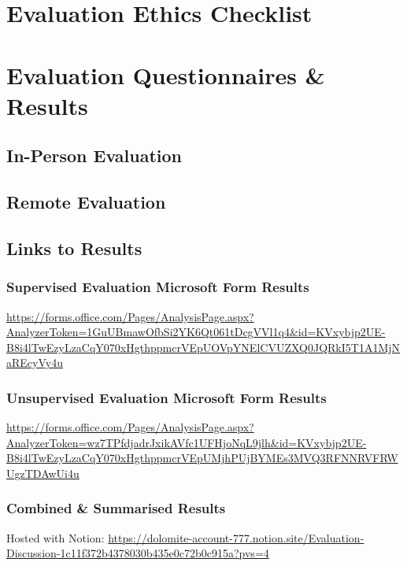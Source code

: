 \documentclass{l4proj}
\begin{document}
\begin{appendices}
\chapter{Evaluation Ethics Checklist}
\label{app:ethics-checklist}


\chapter{Evaluation Questionnaires \& Results}
\label{app:ethics-questionnaires}
\section{In-Person Evaluation}


\section{Remote Evaluation}


\section{Links to Results}
\label{app:result-links}

\subsection{Supervised Evaluation Microsoft Form Results}
\url{https://forms.office.com/Pages/AnalysisPage.aspx?AnalyzerToken=1GuUBmawOfbSi2YK6Qt061tDcgVVl1q4&id=KVxybjp2UE-B8i4lTwEzyLzaCqY070xHgthppmcrVEpUOVpYNElCVUZXQ0JQRkI5T1A1MjNaREcyVy4u}

\subsection{Unsupervised Evaluation Microsoft Form Results}
\url{https://forms.office.com/Pages/AnalysisPage.aspx?AnalyzerToken=wz7TPfdjadrJxikAVfc1UFHjoNqL9jlh&id=KVxybjp2UE-B8i4lTwEzyLzaCqY070xHgthppmcrVEpUMjhPUjBYMEs3MVQ3RFNNRVFRWUgzTDAwUi4u}

\subsection{Combined \& Summarised Results}
Hosted with Notion: \url{https://dolomite-account-777.notion.site/Evaluation-Discussion-1c11f372b4378030b435e0c72b0c915a?pvs=4}


\end{appendices}
\end{document}
